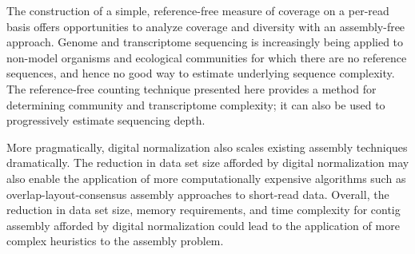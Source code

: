 \documentclass[10pt]{article}
\begin{document}
The construction of a simple, reference-free measure of coverage on a
per-read basis offers opportunities to analyze coverage and
diversity with an assembly-free approach.  Genome and transcriptome
sequencing is increasingly being applied to non-model organisms and
ecological communities for which there are no reference sequences, and
hence no good way to estimate underlying sequence complexity.  The
reference-free counting technique presented here provides a method for
determining community and transcriptome complexity;
it can also be used to progressively estimate sequencing depth.

More pragmatically, digital normalization also scales existing
assembly techniques dramatically.
The reduction in data set size afforded by
digital normalization may also enable the application of more
computationally expensive algorithms such as overlap-layout-consensus
assembly approaches to short-read data.  Overall, the reduction in
data set size, memory requirements, and time complexity for contig
assembly afforded by digital normalization could lead to the
application of more complex heuristics to the assembly problem.

\end{document}
